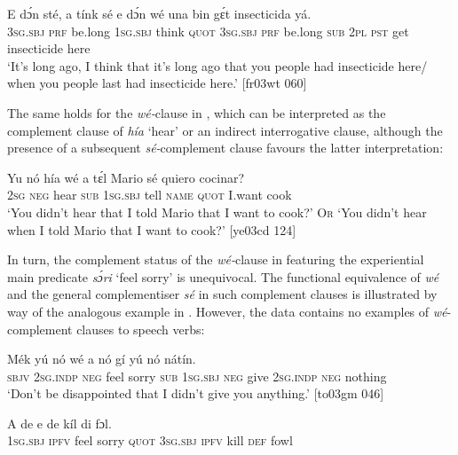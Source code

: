 \ea%
    \label{ex:key:1412}
    \gll E    dɔ́n  sté,    a    tínk    sé    e    dɔ́n  
wé  una  bin  gɛ́t  insecticida  yá.\\
\textsc{3sg.sbj}  \textsc{prf}  be.long  \textsc{1sg.sbj}  think  \textsc{quot}    \textsc{3sg.sbj}  \textsc{prf}  be.long
\textsc{sub}  \textsc{2pl}  \textsc{pst}  get  insecticide  here\\

\glt ‘It’s long ago, I think that it’s long ago that you people had insecticide here/
when you people last had insecticide here.’ [fr03wt 060]
\z

The same holds for the \textit{wé-}clause in , which can be interpreted as the complement clause of \textit{hía} ‘hear’ or an indirect interrogative clause, although the presence of a subsequent \textit{sé-}complement clause favours the latter interpretation: 


\ea%
    \label{ex:key:1413}
    \gll Yu  nó  hía  wé  a    tɛ́l  Mario  sé    quiero  cocinar?\\
\textsc{2sg}  \textsc{neg}  hear  \textsc{sub}  \textsc{1sg.sbj}  tell  \textsc{name}  \textsc{quot}    I.want  cook\\

\glt ‘You didn’t hear that I told Mario that I want to cook?’ \textsc{Or} 
‘You didn’t hear when I told Mario that I want to cook?’ [ye03cd 124]
\z

In turn, the complement status of the \textit{wé-}clause in  featuring the experiential main predicate \textit{sɔ́ri} ‘feel sorry’ is unequivocal. The functional equivalence of \textit{wé} and the general complementiser \textit{sé} in such complement clauses is illustrated by way of the analogous example in . However, the data contains no examples of \textit{wé}{}-complement clauses to speech verbs:


\ea%
    \label{ex:key:1414}
    \gll Mék    yú    nó        wé  a    nó  gí  yú    nó  nátín.\\
\textsc{sbjv}    \textsc{2sg.indp}  \textsc{neg}  feel  sorry  \textsc{sub}  \textsc{1sg.sbj}  \textsc{neg}  give  \textsc{2sg.indp}  \textsc{neg}  nothing\\

\glt ‘Don’t be disappointed that I didn’t give you anything.’ [to03gm 046]
\z


\ea%
    \label{ex:key:1415}
    \gll A    de            e    de  kíl  di  fɔl.\\
\textsc{1sg.sbj}  \textsc{ipfv}  feel  sorry  \textsc{quot}    \textsc{3sg.sbj}  \textsc{ipfv}  kill  \textsc{def}  fowl\\

